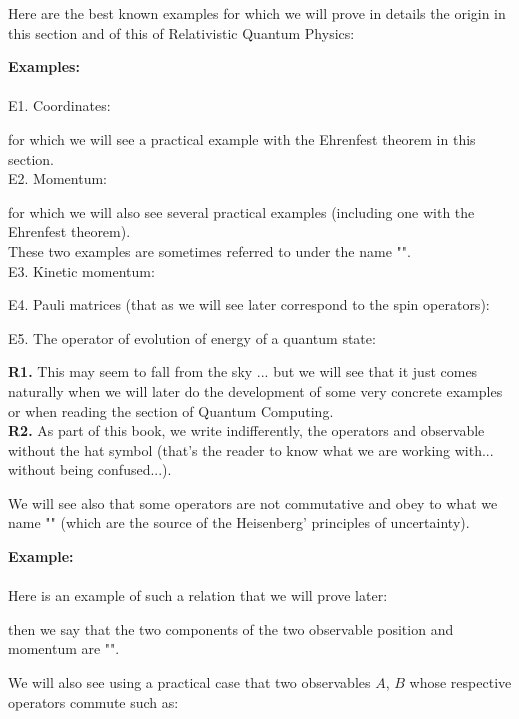 	Here are the best known examples for which we will prove in details the origin in this section and of this of Relativistic Quantum Physics:
	\begin{tcolorbox}[colframe=black,colback=white,sharp corners]
	\textbf{{\Large {}}Examples:}\\\\	
	E1.	Coordinates:
	
	for which we will see a practical example with the Ehrenfest theorem in this section.\\
	
	E2. Momentum:
	
	for which we will also see several practical examples (including one with the Ehrenfest theorem).\\
	
	These two examples are sometimes referred to under the name "".\\
	
	E3. Kinetic momentum:
	

 	E4. Pauli matrices (that as we will see later correspond to the spin operators):
	

	E5. The operator of evolution of energy of a quantum state:
	
	\end{tcolorbox}
	\begin{tcolorbox}[title=Remarks,colframe=black,arc=10pt]
	\textbf{R1.} This may seem to fall from the sky ... but we will see that it just comes naturally when we will later do the development of some very concrete examples or when reading the section of Quantum Computing.\\
	
	\textbf{R2.} As part of this book, we write indifferently, the operators and observable without the hat symbol (that's the reader to know what we are working with... without being confused...).
	\end{tcolorbox}
	We will see also that some operators are not commutative and obey to what we name "" (which are the source of the Heisenberg' principles of uncertainty).
	
	\begin{tcolorbox}[colframe=black,colback=white,sharp corners]
	\textbf{{\Large {}}Example:}\\\\	
	Here is an example of such a relation that we will prove later:
	
	then we say that the two components of the two observable position and momentum are "".
	\end{tcolorbox}
	We will also see using a practical case that two observables $A$, $B$ whose respective operators commute such as:
	
